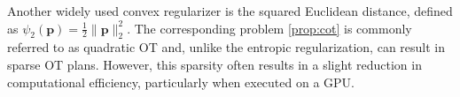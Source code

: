 \begin{remark}
    Another widely used convex regularizer is the squared Euclidean distance, defined as $\psi_{2}(\mathbf{p}) = \frac{1}{2} \| \mathbf{p} \|^2_2$. The corresponding problem \eqref{prop:cot} is commonly referred to as quadratic OT \citep{lorenz2021quadratically} and, unlike the entropic regularization, can result in sparse OT plans. However, this sparsity often results in a slight reduction in computational efficiency, particularly when executed on a GPU.
\end{remark}


